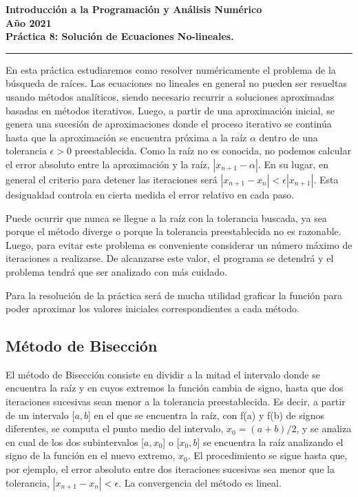 \documentclass[11pt]{article}
\begin{document}
\renewcommand{\labelitemi}{$\bullet$}
\begin{center}
\large{{\bf Introducci\'on a la Programaci\'on y An\'alisis Num\'erico\\[5pt] A\~no 2021}}\\[5pt]
\large{{\bf Pr\'actica 8: Soluci\'on de Ecuaciones No-lineales.}}\\
\rule{17cm}{1pt}
\bigskip
\end{center}

En esta pr\'actica estudiaremos como resolver num\'ericamente el problema de la b\'usqueda de ra\'ices. Las ecuaciones no lineales en general no pueden ser resueltas usando m\'etodos anal\'iticos, siendo necesario recurrir a soluciones aproximadas basadas en m\'etodos iterativos. Luego, a partir de una aproximaci\'on inicial, se genera una sucesi\'on de aproximaciones donde el proceso iterativo se contin\'ua hasta que la aproximaci\'on se encuentra pr\'oxima a la ra\'iz $\alpha$ dentro de una tolerancia $\epsilon > 0$ preestablecida. Como la ra\'iz no es conocida, no podemos calcular el error absoluto entre la aproximaci\'on y la ra\'iz, $|x_{n+1} -\alpha|$. En su lugar, en general el criterio para detener las iteraciones ser\'a $|x_{n+1} - x_{n}| < \epsilon|x_{n+1}|$. Esta desigualdad controla en cierta medida el error relativo en cada paso.\par
Puede ocurrir que nunca se llegue a la ra\'iz con la tolerancia buscada, ya sea porque el m\'etodo diverge o porque la tolerancia preestablecida no es razonable. Luego, para evitar este problema es conveniente considerar un n\'umero m\'aximo de iteraciones a realizarse. De alcanzarse este valor, el programa se detendr\'a y el problema tendr\'a que ser analizado con m\'as cuidado. \par
Para la resoluci\'on de la pr\'actica ser\'a de mucha utilidad graficar la funci\'on para poder aproximar los valores iniciales correspondientes a cada m\'etodo.\par


\subsection*{M\'etodo de Bisecci\'on}

El m\'etodo de Bisecci\'on consiste en dividir a la mitad el intervalo donde se encuentra la ra\'iz y en cuyos extremos la funci\'on cambia de signo, hasta que dos iteraciones sucesivas sean menor a la tolerancia preestablecida. Es decir, a partir de un intervalo [$a, b$] en el que se encuentra la ra\'iz, con f(a) y f(b) de signos diferentes, se computa el punto medio del intervalo, $x_{0}= (a+b)/2$, y se analiza en cual de los dos subintervalos [$a, x_{0}$] o [$x_{0}, b$] se encuentra la ra\'iz analizando el signo de la funci\'on en el nuevo extremo, $x_{0}$. El procedimiento se sigue hasta que, por ejemplo, el error absoluto entre dos iteraciones sucesivas sea menor que la tolerancia, $|x_{n+1} - x_{n}| < \epsilon $. La convergencia del m\'etodo es lineal. 
\end{document}
